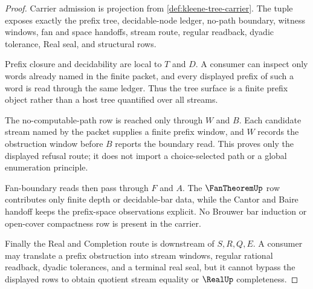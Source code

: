 \begin{proof}
Carrier admission is projection from \autoref{def:kleene-tree-carrier}. The tuple exposes exactly the prefix tree, decidable-node ledger, no-path boundary, witness windows, fan and space handoffs, stream route, regular readback, dyadic tolerance, Real seal, and structural rows.

Prefix closure and decidability are local to $T$ and $D$. A consumer can inspect only words already named in the finite packet, and every displayed prefix of such a word is read through the same ledger. Thus the tree surface is a finite prefix object rather than a host tree quantified over all streams.

The no-computable-path row is reached only through $W$ and $B$. Each candidate stream named by the packet supplies a finite prefix window, and $W$ records the obstruction window before $B$ reports the boundary read. This proves only the displayed refusal route; it does not import a choice-selected path or a global enumeration principle.

Fan-boundary reads then pass through $F$ and $A$. The $\FanTheoremUp$ row contributes only finite depth or decidable-bar data, while the Cantor and Baire handoff keeps the prefix-space observations explicit. No Brouwer bar induction or open-cover compactness row is present in the carrier.

Finally the Real and Completion route is downstream of $S,R,Q,E$. A consumer may translate a prefix obstruction into stream windows, regular rational readback, dyadic tolerances, and a terminal real seal, but it cannot bypass the displayed rows to obtain quotient stream equality or $\RealUp$ completeness.
\end{proof}

